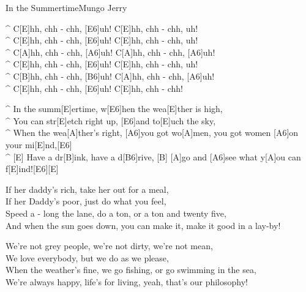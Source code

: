 \begin{song}{In the Summertime}{Mungo Jerry}

\begin{guitar}
^ C[E]hh, chh - chh, [E6]uh! C[E]hh, chh - chh, uh! \\
^ C[E]hh, chh - chh, [E6]uh! C[E]hh, chh - chh, uh!\\
^ C[A]hh, chh - chh, [A6]uh! C[A]hh, chh - chh, [A6]uh! \\
^ C[E]hh, chh - chh, [E6]uh! C[E]hh, chh - chh, uh!\\
^ C[B]hh, chh - chh, [B6]uh! C[A]hh, chh - chh, [A6]uh!\\
^ C[E]hh, chh - chh, [E6]uh! C[E]hh, chh - chh!\\
\end{guitar}

\begin{guitar}
^ In the summ[E]ertime, w[E6]hen the wea[E]ther is high,\\
^ You can str[E]etch right up, [E6]and to[E]uch the sky,\\
^ When the wea[A]ther's right, [A6]you got wo[A]men, you got women [A6]on your mi[E]nd,[E6]\\
^ [E]   Have a dr[B]ink, have a d[B6]rive, [B]    [A]go and [A6]see what y[A]ou can f[E]ind![E6][E]\\
\end{guitar}


\begin{guitar}
If her daddy's rich, take her out for a meal,\\
If her Daddy's poor, just do what you feel,\\
Speed a - long the lane, do a ton, or a ton and twenty five,\\
And when the sun goes down, you can make it, make it good in a lay-by!\\
\end{guitar}

\begin{guitar}
We're not grey people, we're not dirty, we're not mean,\\
We love everybody, but we do as we please,\\
When the weather's fine, we go fishing, or go swimming in the sea,\\
We're always happy, life's for living, yeah, that's our philosophy!\\
\end{guitar}


\end{song}
